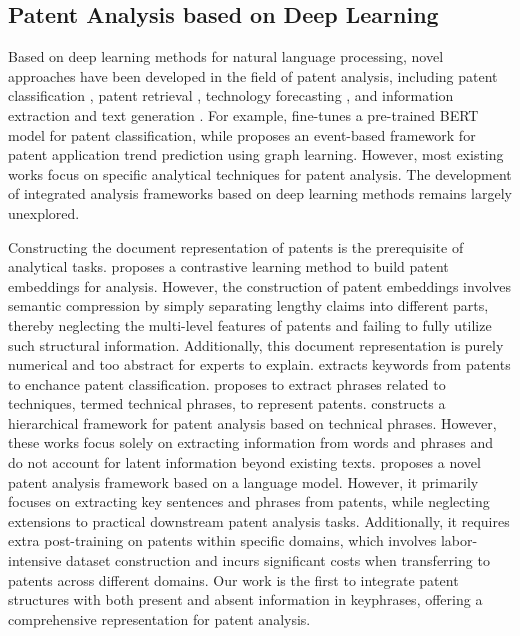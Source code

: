 \subsection{Patent Analysis based on Deep Learning}
Based on deep learning methods for natural language processing, novel approaches have been developed in the field of patent analysis, including patent classification \cite{patent_bert}, patent retrieval \cite{patent_retrieval}, technology forecasting \cite{patent_tkde}, and information extraction and text generation \cite{patent_generation}. For example, \cite{patent_bert} fine-tunes a pre-trained BERT model for patent classification, while \cite{patent_tkde} proposes an event-based framework for patent application trend prediction using graph learning. However, most existing works focus on specific analytical techniques for patent analysis. The development of integrated analysis frameworks based on deep learning methods remains largely unexplored.

Constructing the document representation of patents is the prerequisite of analytical tasks.
\cite{copate} proposes a contrastive learning method to build patent embeddings for analysis. However, the construction of patent embeddings involves semantic compression by simply separating lengthy claims into different parts, thereby neglecting the multi-level features of patents and failing to fully utilize such structural information. Additionally, this document representation is purely numerical and too abstract for experts to explain.
\cite{keyword_patent} extracts keywords from patents to enchance patent classification. \cite{tpe} proposes to extract phrases related to techniques, termed technical phrases, to represent patents. \cite{techpat} constructs a hierarchical framework for patent analysis based on technical phrases. However, these works focus solely on extracting information from words and phrases and do not account for latent information beyond existing texts.
\cite{ai_patent} proposes a novel patent analysis framework based on a language model. However, it primarily focuses on extracting key sentences and phrases from patents, while neglecting extensions to practical downstream patent analysis tasks. Additionally, it requires extra post-training on patents within specific domains, which involves labor-intensive dataset construction and incurs significant costs when transferring to patents across different domains.
Our work is the first to integrate patent structures with both present and absent information in keyphrases, offering a comprehensive representation for patent analysis.
